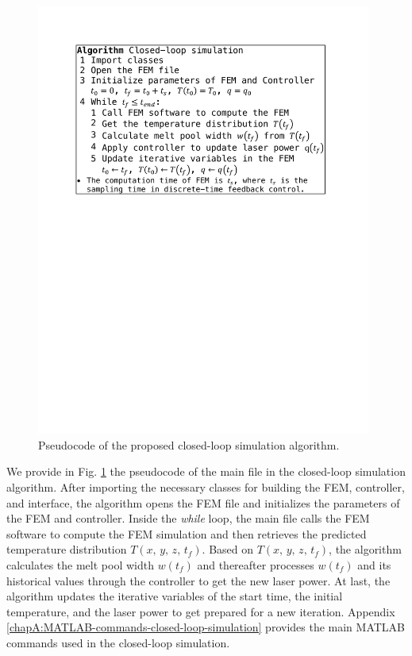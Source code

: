 \documentclass [11pt, proquest] {uwthesis}[2020/02/24]
\begin{document}
\begin{figure}[!ht]
\begin{centering}
\includegraphics[clip,width=11cm]{Closed-loop-simulation/pseudocode_math}
\par\end{centering}
\centering{}\caption{\label{fig:Pseudocode-for-the}Pseudocode of the proposed closed-loop simulation
algorithm.}
\end{figure}
We provide in Fig. \ref{fig:Pseudocode-for-the} the pseudocode of
the main file in the closed-loop simulation algorithm. After importing
the necessary classes for building the FEM, controller, and interface,
the algorithm opens the FEM file and initializes the parameters of
the FEM and controller. Inside the \emph{while} loop, the main file
calls the FEM software to compute the FEM simulation and then retrieves
the predicted temperature distribution $T(x,\,y,\,z,\,t_{f})$. Based
on $T(x,\,y,\,z,\,t_{f})$, the algorithm calculates the melt pool
width $w(t_{f})$ and thereafter processes $w(t_{f})$ and its historical
values through the controller to get the new laser power. At last,
the algorithm updates the iterative variables of the start time, the
initial temperature, and the laser power to get prepared for a new
iteration. Appendix \ref{chapA:MATLAB-commands-closed-loop-simulation} provides the main MATLAB commands used in
the closed-loop simulation.
\end{document}
